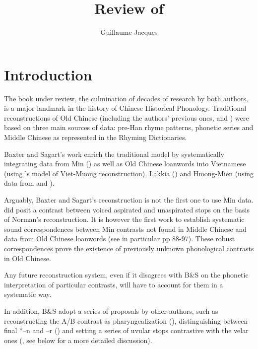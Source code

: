 \documentclass[oldfontcommands,oneside,a4paper,11pt]{article}
\newcommand{\ipa}[1]{{\phon #1}} %
\begin{document}
 


\title{Review of \citet{bs14oc}}  

\author{Guillaume Jacques}
\maketitle


\section{Introduction}
The book under review, the culmination of decades of research by both authors, is a major landmark in the history of Chinese Historical Phonology. Traditional reconstructions of Old Chinese (including the authors' previous ones, \citealt{baxter92} and \citealt{sagart99roc}) were based on three main sources of data: pre-Han rhyme patterns, phonetic series and Middle Chinese as represented in the Rhyming Dictionaries.

Baxter and Sagart's work enrich the traditional model by systematically integrating data from Min (\citealt{norman74protomin}) as well as Old Chinese loanwords into Vietnamese (using \citealt{ferlus82spirantisation}'s model of Viet-Muong reconstruction), Lakkia (\citealt{ferlus96kamsui}) and Hmong-Mien (using data from \citealt{wang95protomy} and \citealt{ratliff10protohm}).

Arguably, Baxter and Sagart's reconstruction is not the first one to use Min data. \citet{starostin89} did posit a contrast between voiced aspirated and unaspirated stops on the basis of Norman's reconstruction. It is however the first work to establish systematic sound correspondences between Min contrasts not found in Middle Chinese and data from Old Chinese loanwords (see in particular pp 88-97). These robust correspondences prove the existence of previously unknown phonological contrasts in Old Chinese.

Any future reconstruction system, even if it disagrees with B\&S on the phonetic interpretation of particular contrasts, will have to account for them in a systematic way.

In addition, B\&S adopt a series of proposals by other authors, such as reconstructing the A/B contrast as pharyngealization (\citealt{norman94pharyngeal}), distinguishing between final *\ipa{--n} and \ipa{--r} (\citealt{starostin89}) and setting a series of uvular stops contrastive with the velar ones (\citealt{pan97houyin}, see below for a more detailed discussion).
\end{document}
